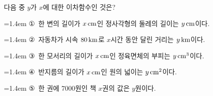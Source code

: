 다음 중 $y$가 $x$에 대한 이차함수인 것은?
\par\medskip\par\noindent\hangindent=1.4em {\small ①}\ 한 변의 길이가 $x\mkern3mu \mathrm{cm}$인 정사각형의 둘레의 길이는 $y\mkern3mu \mathrm{cm}$이다.\par\noindent\hangindent=1.4em {\small ②}\ 자동차가 시속 $80\mkern3mu \mathrm{km}$로 $x$시간 동안 달린 거리는 $y\mkern3mu \mathrm{km}$이다.\par\noindent\hangindent=1.4em {\small ③}\ 한 모서리의 길이가 $x\mkern3mu \mathrm{cm}$인 정육면체의 부피는 $y\mkern3mu \mathrm{cm}^3$이다.\par\noindent\hangindent=1.4em {\small ④}\ 반지름의 길이가 $x\mkern3mu \mathrm{cm}$인 원의 넓이는 $y\mkern3mu \mathrm{cm}^2$이다.\par\noindent\hangindent=1.4em {\small ⑤}\ 한 권에 $7000$원인 책 $x$권의 값은 $y$원이다.\par\medskip
